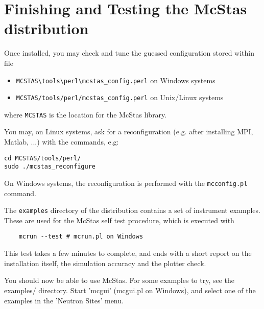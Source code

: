 \section{Finishing and Testing the McStas distribution}
\label{s:testing}

Once installed, you may check and tune the guessed configuration stored within file
\begin{itemize}
\item{\verb+MCSTAS\tools\perl\mcstas_config.perl+ on Windows systems}
\item{\verb+MCSTAS/tools/perl/mcstas_config.perl+ on Unix/Linux systems}
\end{itemize}
where \verb+MCSTAS+ is the location for the McStas library.

You may, on Linux systems, ask for a reconfiguration (e.g. after installing MPI, Matlab, ...) with the commands, e.g:
\begin{verbatim}
cd MCSTAS/tools/perl/
sudo ./mcstas_reconfigure
\end{verbatim}
On Windows systems, the reconfiguration is performed with the \verb+mcconfig.pl+ command.

The \verb+examples+ directory of the distribution contains a set of instrument examples. These are used for the McStas self test procedure, which is executed with
\begin{verbatim}
    mcrun --test # mcrun.pl on Windows
\end{verbatim}
This test takes a few minutes to complete, and ends with a short report on the installation itself, the simulation accuracy and the plotter check.

You should now be able to use McStas. For some examples to try, see the
examples/ directory. Start 'mcgui' (mcgui.pl on Windows), and select one of the examples in the 'Neutron Sites' menu.
